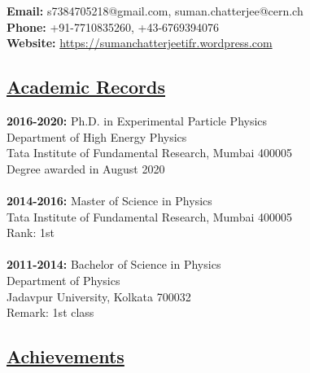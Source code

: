 \documentclass[a4paper,11pt]{article}
\begin{document}
{\textbf{Email:} s7384705218@gmail.com, suman.chatterjee@cern.ch\\
\textbf{Phone: } +91-7710835260, +43-6769394076\\
\textbf{Website: } \href{https://sumanchatterjeetifr.wordpress.com}{https://sumanchatterjeetifr.wordpress.com}


\subsection*{\underline{Academic Records}}

\textbf{2016-2020:}
Ph.D. in Experimental Particle Physics\\
Department of High Energy Physics\\
Tata Institute of Fundamental Research, Mumbai 400005\\
Degree awarded in August 2020
\\
\\
\textbf{2014-2016:}
Master of Science in Physics\\
Tata Institute of Fundamental Research, Mumbai 400005\\
Rank: 1st
\\
\\
\textbf{2011-2014:}
Bachelor of Science in Physics\\
Department of Physics\\
Jadavpur University, Kolkata  700032\\
Remark: 1st class

\subsection*{\underline{Achievements}}

}
\end{document}
